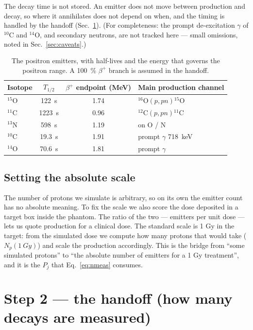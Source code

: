 \documentclass[11pt]{article}
\newcommand{\bplus}{\beta^{+}}
\newcommand{\Cl}[1]{{}^{#1}\mathrm{C}}
\newcommand{\Ox}[1]{{}^{#1}\mathrm{O}}
\newcommand{\Nt}[1]{{}^{#1}\mathrm{N}}
\begin{document}
The decay time is not stored. An emitter does not move between production and decay, so
where it annihilates does not depend on when, and the timing is handled by the handoff
(Sec.~\ref{sec:handoff}). (For completeness: the prompt de-excitation $\gamma$ of
$\Cl{10}$ and $\Ox{14}$, and secondary neutrons, are not tracked here --- small
omissions, noted in Sec.~\ref{sec:caveats}.)

\begin{table}[h]
\centering
\caption{The positron emitters, with half-lives and the energy that governs the
positron range. A \SI{100}{\percent} $\bplus$ branch is assumed in the handoff.}
\label{tab:iso}
\begin{tabular}{lccl}
\toprule
Isotope & $T_{1/2}$ & $\bplus$ endpoint (MeV) & Main production channel \\
\midrule
$\Ox{15}$ & \SI{122}{s}   & 1.74 & $\Ox{16}(p,pn)\Ox{15}$ \\
$\Cl{11}$ & \SI{1223}{s}  & 0.96 & $\Cl{12}(p,pn)\Cl{11}$ \\
$\Nt{13}$ & \SI{598}{s}   & 1.19 & on O / N \\
$\Cl{10}$ & \SI{19.3}{s}  & 1.91 & prompt $\gamma$ \SI{718}{keV} \\
$\Ox{14}$ & \SI{70.6}{s}  & 1.81 & prompt $\gamma$ \\
\bottomrule
\end{tabular}
\end{table}

\subsection{Setting the absolute scale}
\label{sec:norm}
The number of protons we simulate is arbitrary, so on its own the emitter count has
no absolute meaning. To fix the scale we also score the dose deposited in a target box
inside the phantom. The ratio of the two --- emitters per unit dose --- lets us quote
production for a clinical dose. The standard scale is 1 Gy in the target:
from the simulated dose we compute how many protons that would take
($N_p(\SI{1}{Gy})$) and scale the production accordingly. This is the bridge from
``some simulated protons'' to ``the absolute number of emitters for a 1 Gy
treatment'', and it is the $P_j$ that Eq.~\eqref{eq:nmeas} consumes.

\section{Step 2 --- the handoff (how many decays are measured)}
\label{sec:handoff}
\end{document}
